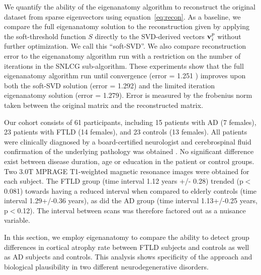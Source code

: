 \documentclass{llncs}
\newcommand{\vv}{{\bf v}}
\begin{document}
 We quantify the ability of the eigenanatomy algorithm to reconstruct the original dataset from sparse eigenvectors using equation~\ref{eq:recon}.  As a baseline, we compare the full eigenanatomy solution to the reconstruction given by applying the soft-threshold function $S$ directly to the SVD-derived vectors $\vv_i^p$ without further optimization.  We call this ``soft-SVD''.  We also compare reconstruction error to the eigenanatomy algorithm run with a restriction on the number of iterations in the SNLCG sub-algorithm.  These experiments show that the full eigenanatomy algorithm run until convergence (error = 1.251 ) improves upon both the soft-SVD solution (error = 1.292) and the limited iteration eigenanatomy solution (error = 1.279). Error is measured by the frobenius norm taken between the original matrix and the reconstructed matrix.\newline

 Our cohort consists of 61 participants, including 15 patients with AD (7 females), 23 patients with FTLD (14 females), and 23 controls (13 females). All patients were clinically diagnosed by a board-certified neurologist and cerebrospinal fluid confirmation of the underlying pathology was obtained \cite{Irwin2011}.  No significant difference exist between disease
duration, age or education in the patient or control groups.  Two 3.0T MPRAGE T1-weighted magnetic resonance images were obtained for each subject.  The FTLD group (time interval 1.12 years +/- 0.28) trended (p$<$0.081) towards having a reduced interval when compared to elderly controls (time interval 1.29+/-0.36 years), as did the AD group (time interval 1.13+/-0.25 years, p$<$0.12). The interval between scans was therefore factored out as a nuisance variable.



  In this section, we employ eigenanatomy to compare the ability to detect group differences in cortical atrophy rate between FTLD subjects and controls as well as AD subjects and controls.  This analysis shows specificity of the approach and biological plausibility in two different neurodegenerative disorders.  
\end{document}
